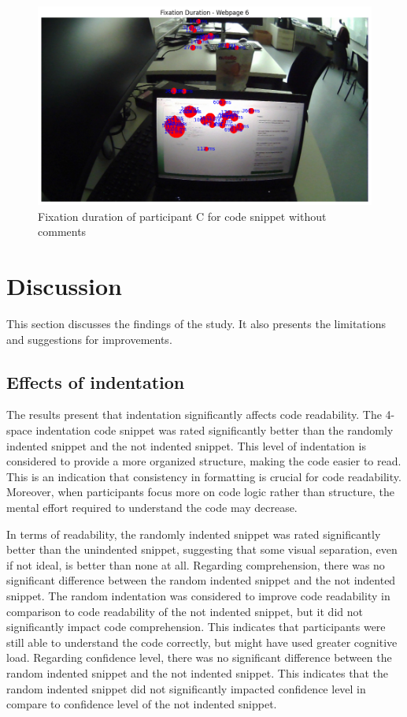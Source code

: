 \begin{figure} [H]
  \centering
  \includegraphics[scale=0.6]{figures/0-com.png}
  \caption{Fixation duration of  participant C for code snippet without comments}
  \label{fig:AnhangsChor}
\end{figure}





\chapter{Discussion}
This section discusses the findings of the study. It also presents the limitations and suggestions for improvements.


\section{Effects of indentation} 
The results present that indentation significantly affects code readability. The 4-space indentation code snippet was rated significantly better than the randomly indented snippet and the not indented snippet. This level of indentation is considered to provide a more organized structure, making the code easier to read. This is an indication that consistency in formatting is crucial for code readability. Moreover, when participants focus more on code logic rather than structure, the mental effort required to understand the code may decrease.


In terms of readability, the randomly indented snippet was rated significantly better than the unindented snippet, suggesting that some visual separation, even if not ideal, is better than none at all.  Regarding comprehension, there was no significant difference between the random indented snippet and the not indented snippet. The random indentation was considered to improve code readability in comparison to code readability of the not indented snippet, but it did not significantly impact code comprehension.  This indicates that participants were still able to understand the code correctly, but might have used greater cognitive load. Regarding confidence level, there was no significant difference between the random indented snippet and the not indented snippet. This indicates that the random indented snippet did not significantly impacted confidence level in compare to confidence level of the not indented snippet. 


